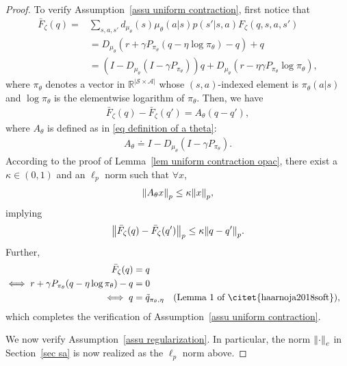 \documentclass[twoside,11pt]{article}
\newcommand{\fS}{\mathcal{S}}
\newcommand{\fA}{\mathcal{A}}
\newcommand{\R}{\mathbb{R}}
\newcommand{\nsa}{{|\fS \times \fA|}}
\numberwithin{assucounter}{section}
\begin{document}
\begin{proof}
  To verify Assumption~\ref{assu uniform contraction},
  first notice that
  \begin{align}
    \bar F_\zeta(q) =& \sum_{s, a, s'} d_{\mu_\theta}(s) \mu_\theta(a|s)p(s'|s, a) F_\zeta(q, s, a, s') \\
    &= D_{\mu_\theta}\left(r + \gamma P_{\pi_\theta} \left(q - \eta \log \pi_\theta\right)  -  q\right) + q \\
    &= (I - D_{\mu_\theta}(I - \gamma P_{\pi_\theta})) q + D_{\mu_\theta}(r - \eta \gamma P_{\pi_\theta} \log \pi_\theta),
  \end{align}
  where $\pi_\theta$ denotes a vector in $\R^{\nsa}$ whose $(s, a)$-indexed element is $\pi_\theta(a|s)$ and $\log \pi_\theta$ is the elementwise logarithm of $\pi_\theta$.
  Then, we have
  \begin{align}
    \bar F_{\zeta}(q) - \bar F_{\zeta}(q') = A_{\theta} (q - q'),
  \end{align}
  where $A_{\theta}$ is defined as in \eqref{eq definition of a theta}:
  \begin{align*}
      A_\theta \doteq I - D_{\mu_\theta}(I - \gamma P_{\pi_\theta}).
  \end{align*}
  According to the proof of Lemma~\ref{lem uniform contraction opac},
  there exist a $\kappa \in (0, 1)$ and an $\ell_p$ norm such that $\forall x$,
  \begin{align}
    \norm{A_\theta x}_p \leq \kappa \norm{x}_p,
  \end{align}
  implying
  \begin{align}
    \norm{\bar F_{\zeta}(q) - \bar F_{\zeta}(q')}_p \leq \kappa \norm{q - q'}_p.
  \end{align}
  Further,
  \begin{align}
    \bar F_\zeta(q) &=q \\
    \iff r + \gamma P_{\pi_\theta}(q - \eta \log \pi_\theta) - q &= 0 \\
    \iff q &= \tilde q_{\pi_\theta, \eta} \qq{(Lemma 1 of \citet{haarnoja2018soft}),}
  \end{align}
  which completes the verification of Assumption~\ref{assu uniform contraction}.

  We now verify Assumption~\ref{assu regularization}.
  In particular,
  the norm $\norm{\cdot}_c$ in Section~\ref{sec sa} is now realized as the $\ell_p$ norm above.


\end{proof}
\end{document}
